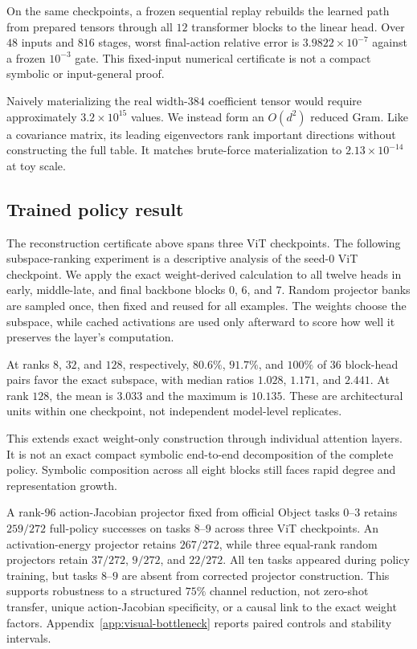 \documentclass{article}
\begin{document}
On the same checkpoints, a frozen sequential replay rebuilds the learned path from prepared
tensors through all $12$ transformer blocks to the linear head. Over $48$ inputs and $816$
stages, worst final-action relative error is $3.9822\times10^{-7}$ against a frozen $10^{-3}$
gate. This fixed-input numerical certificate is not a compact symbolic or input-general proof.

Naively materializing the real width-$384$ coefficient tensor would require approximately
$3.2\times10^{15}$ values. We instead form an $O(d^2)$ reduced Gram. Like a covariance
matrix, its leading eigenvectors rank important directions without constructing the full
table. It matches brute-force materialization to $2.13\times10^{-14}$ at toy scale.

\subsection{Trained policy result}

The reconstruction certificate above spans three ViT checkpoints. The following subspace-ranking
experiment is a descriptive analysis of the seed-$0$ ViT checkpoint. We apply the exact
weight-derived calculation to all twelve heads in early, middle-late, and
final backbone blocks $0$, $6$, and $7$. Random projector banks are sampled once, then fixed
and reused for all examples. The weights choose the subspace, while cached activations are
used only afterward to score how well it preserves the layer's computation.

At ranks $8$, $32$, and $128$, respectively, $80.6\%$, $91.7\%$, and $100\%$ of $36$ block-head
pairs favor the exact subspace, with median ratios $1.028$, $1.171$, and $2.441$. At rank $128$,
the mean is $3.033$ and the maximum is $10.135$. These are architectural units within one
checkpoint, not independent model-level replicates.

This extends exact weight-only construction through individual attention layers. It is not an
exact compact symbolic end-to-end decomposition of the complete policy. Symbolic composition across all eight blocks
still faces rapid degree and representation growth.

A rank-$96$ action-Jacobian projector fixed from official Object tasks $0$--$3$ retains $259/272$
full-policy successes on tasks $8$--$9$ across three ViT checkpoints. An activation-energy
projector retains $267/272$, while three equal-rank random projectors retain $37/272$, $9/272$, and
$22/272$. All ten tasks appeared during policy training, but tasks $8$--$9$ are absent from corrected
projector construction. This supports robustness to a structured $75\%$ channel reduction, not
zero-shot transfer, unique action-Jacobian specificity, or a causal link to the exact weight
factors. Appendix~\ref{app:visual-bottleneck} reports paired controls and stability intervals.
\end{document}
